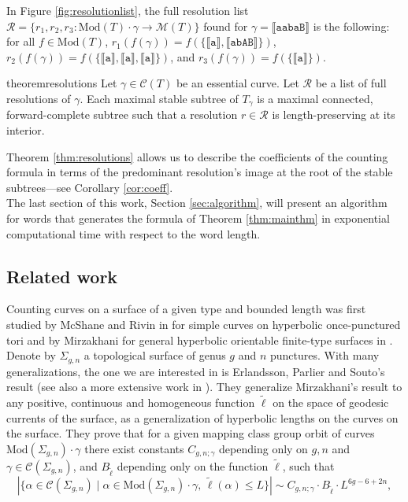 \documentclass{article}
\begin{document}
	
	
	

    In Figure \ref{fig:resolutionlist}, the full resolution list $\mathcal{R}=\{r_1,r_2,r_3:\mathrm{Mod}(T)\cdot \gamma\to \mathcal{M}(T)\}$ found for $\gamma=\llbracket \mathtt{aabaB}\rrbracket$ is the following: for all $f\in\mathrm{Mod}(T)$, $r_1(f(\gamma))=f(\{\llbracket \mathtt{a}\rrbracket,\llbracket \mathtt{abAB}\rrbracket\})$, $r_2(f(\gamma))=f(\{\llbracket \mathtt{a}\rrbracket,\llbracket \mathtt{a}\rrbracket,\llbracket \mathtt{a}\rrbracket\})$, and $r_3(f(\gamma))=f(\{\llbracket \mathtt{a}\rrbracket\})$.
	
	
	
	
	\begin{restatable}{theorem}{resolutions}\label{thm:resolutions}
		Let $\gamma\in\mathcal{C}(T)$ be an essential curve. Let $\mathcal{R}$ be a list of full resolutions of $\gamma$. Each maximal stable subtree of $T_\gamma$ is a maximal connected, forward-complete subtree such that a resolution $r\in\mathcal{R}$ is length-preserving at its interior. 
	\end{restatable}
	
	Theorem \ref{thm:resolutions} allows us to describe the coefficients of the counting formula in terms of the predominant resolution's image at the root of the stable subtrees---see Corollary \ref{cor:coeff}.\\
	
	The last section of this work, Section \ref{sec:algorithm}, will present an algorithm for words that generates the formula of Theorem \ref{thm:mainthm} in exponential computational time with respect to the word length. \\
	
		
	\subsection*{Related work}
	
	Counting curves on a surface of a given type and bounded length was first studied by McShane and Rivin in \cite{McSR95} for simple curves on hyperbolic once-punctured tori and by Mirzakhani for general hyperbolic orientable finite-type surfaces in \cite{Mirzakhani:first,Mirzakhani:last}. Denote by $\Sigma_{g,n}$ a topological surface of genus $g$ and $n$ punctures. With many generalizations, the one we are interested in is Erlandsson, Parlier and Souto's result \cite{ErlandssonParlierSouto20} (see also a more extensive work in \cite{ErlandssonSouto}). They generalize Mirzakhani's result to any positive, continuous and homogeneous function $\tilde{\ell}$ on the space of geodesic currents of the surface, as a generalization of hyperbolic lengths on the curves on the surface. They prove that for a given mapping class group orbit of curves $\mathrm{Mod}(\Sigma_{g,n})\cdot\gamma$ there exist constants $C_{g,n;\gamma}$ depending only on $g,n$ and $\gamma\in\mathcal{C}(\Sigma_{g,n})$, and $B_{\tilde\ell}$ depending only on the function $\tilde\ell$, such that
	\[
	| \{ \alpha \in \mathcal{C}(\Sigma_{g,n}) \mid \alpha \in\mathrm{Mod}(\Sigma_{g,n})\cdot \gamma , \, \tilde\ell(\alpha) \leq L \}|
	\sim
	C_{g,n;\gamma} \cdot B_{\tilde\ell} \cdot L^{6g-6+2n},
	\]
	
\end{document}
